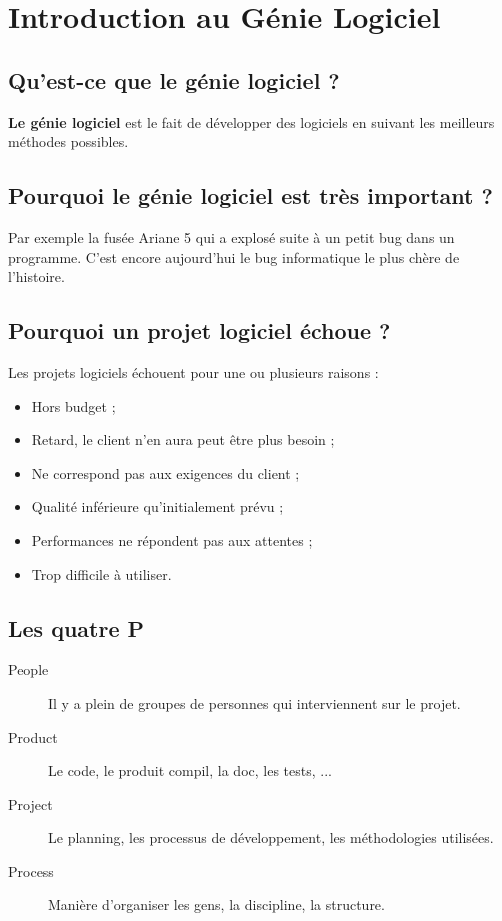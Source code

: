 \section{Introduction au Génie Logiciel}



\subsection{Qu'est-ce que le génie logiciel ?}
\textbf{Le génie logiciel} est le fait de développer des logiciels en suivant les meilleurs méthodes possibles.



\subsection{Pourquoi le génie logiciel est très important ?}
Par exemple la fusée Ariane 5 qui a explosé suite à un petit bug dans un programme. C'est encore aujourd'hui le bug informatique le plus chère de l'histoire.



\subsection{Pourquoi un projet logiciel échoue ?}
Les projets logiciels échouent pour une ou plusieurs raisons :
\begin{itemize}
    \item Hors budget ;
    \item Retard, le client n'en aura peut être plus besoin ;
    \item Ne correspond pas aux exigences du client ;
    \item Qualité inférieure qu'initialement prévu ;
    \item Performances ne répondent pas aux attentes ;
    \item Trop difficile à utiliser.
\end{itemize}



\subsection{Les quatre P}
\begin{description}
    \item [People] Il y a plein de groupes de personnes qui interviennent sur le projet.
    \item [Product] Le code, le produit compil, la doc, les tests, ...
    \item [Project] Le planning, les processus de développement, les méthodologies utilisées.
    \item [Process] Manière d'organiser les gens, la discipline, la structure.
\end{description}



